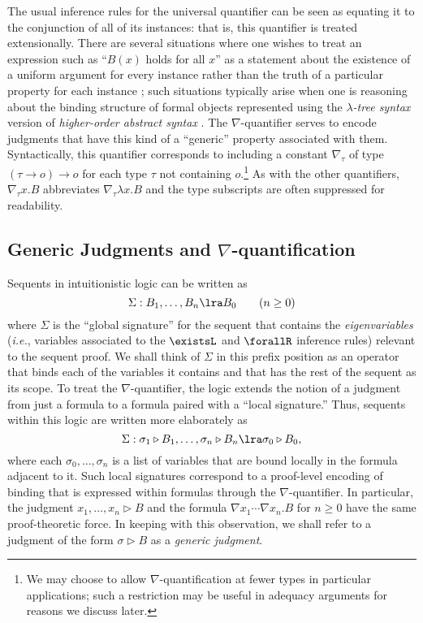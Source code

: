 The usual inference rules for the universal quantifier can be seen as
equating it to the conjunction of all of its instances: that is, this
quantifier is treated extensionally.
There are several situations  where one
wishes to treat an expression such as ``$B(x)$ holds for all
$x$'' as a statement about the existence of a uniform argument for
every instance rather than the truth of a particular property for each
instance \cite{miller05tocl};
such situations typically arise when one is reasoning about the
binding structure of formal objects represented using the
$\lambda${\em -tree syntax} \cite{miller00cl} version of {\em
higher-order abstract syntax} \cite{pfenning88pldi}.
The $\nabla$-quantifier serves to encode judgments that have this kind
of a ``generic'' property associated with them. Syntactically, this
quantifier corresponds to
including a constant $\nabla_\tau$ of type $(\tau \rightarrow o)
\rightarrow o$ for each type $\tau$ not containing $o$.\footnote{
We may choose to allow $\nabla$-quantification at fewer types in
particular applications; such a restriction may be
  useful in adequacy arguments for reasons we discuss later.}
As with the
other quantifiers, $\nabla_\tau x. B$ abbreviates $\nabla_\tau \lambda
x. B$ and the type subscripts are often suppressed for readability.

\subsection{Generic Judgments and $\nabla$-quantification}

Sequents in intuitionistic logic can be written as
\[\Sigma : B_1, \ldots, B_n \lra B_0 \qquad (n\ge0)
\]
where $\Sigma$ is the ``global signature'' for the sequent that
contains the {\em eigenvariables} ({\em i.e.}, variables associated to
the $\existsL$ and $\forallR$ inference rules) relevant to the sequent
proof. We shall think of $\Sigma$ in this prefix position as an
operator that binds each of the variables it contains and that has the
rest of the sequent as its scope. To treat the $\nabla$-quantifier,
the \foldnb logic \cite{miller05tocl} extends the notion of a judgment
from just a formula to a formula paired with a ``local signature.''
Thus, sequents within this logic are written more elaborately as
\[\Sigma : \sigma_1\triangleright B_1, \ldots,
           \sigma_n\triangleright B_n \lra
           \sigma_0\triangleright B_0,
\]
where each $\sigma_0, \ldots, \sigma_n$ is a list of variables that are
bound locally in the formula adjacent to it.  Such local signatures
correspond to a proof-level encoding of binding that is expressed
within formulas through the $\nabla$-quantifier. In particular, the
judgment $x_1,\ldots,x_n\triangleright B$ and the formula $\nabla
x_1\cdots\nabla x_n.B$ for $n \ge 0$ have the same proof-theoretic
force. In keeping with this observation, we shall refer to a judgment
of the form $\sigma \triangleright B$ as a {\it generic judgment}.


